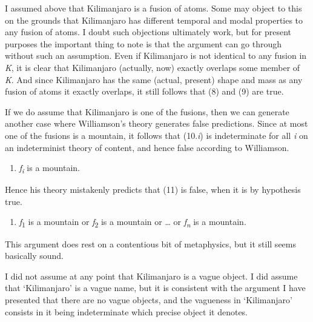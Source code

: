 I assumed above that Kilimanjaro is a fusion of atoms. Some may object to this on the grounds that Kilimanjaro has different temporal and modal properties to any fusion of atoms. I doubt such objections ultimately work, but for present purposes the important thing to note is that the argument can go through without such an assumption. Even if Kilimanjaro is not identical to any fusion in \textit{K}, it is clear that Kilimanjaro (actually, now) exactly overlaps some member of \textit{K}. And since Kilimanjaro has the same (actual, present) shape and mass as any fusion of atoms it exactly overlaps, it still follows that (8) and (9) are true.

If we do assume that Kilimanjaro is one of the fusions, then we can generate another case where Williamson's theory generates false predictions. Since at most one of the fusions is a mountain, it follows that (10.\textit{i}) is indeterminate for all \textit{i} on an indeterminist theory of content, and hence false according to Williamson.


\begin{enumerate}
\renewcommand{\labelenumi}{(\arabic{enumi}.\textit{i})}
\setcounter{enumi}{9}
\item \textit{f}\textit{\textsubscript{i}} is a mountain.
\end{enumerate}

\noindent Hence his theory mistakenly predicts that (11) is false, when it is by hypothesis true.

\begin{enumerate}
\renewcommand{\labelenumi}{(\arabic{enumi})}
\setcounter{enumi}{10}
\item \textit{f}\textsubscript{1} is a mountain or \textit{f}\textsubscript{2} is a mountain or {\dots} or \textit{f}\textit{\textsubscript{n}} is a mountain. 
\end{enumerate}

\noindent This argument does rest on a contentious bit of metaphysics, but it still seems basically sound.

I did not assume at any point that Kilimanjaro is a vague object. I did assume that `Kilimanjaro' is a vague name, but it is consistent with the argument I have presented that there are no vague objects, and the vagueness in `Kilimanjaro' consists in it being indeterminate which precise object it denotes.

